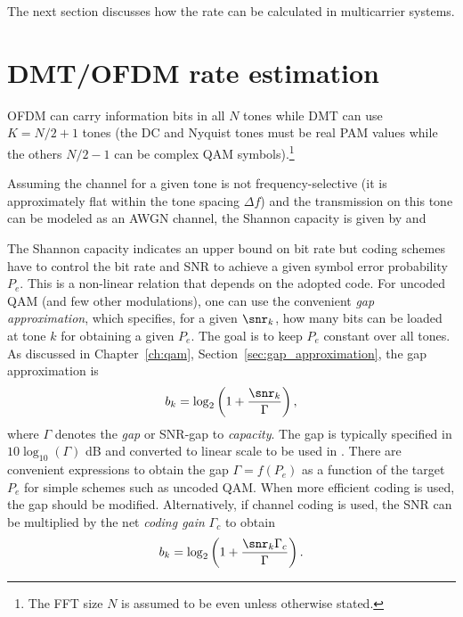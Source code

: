 
The next section discusses how the rate can be calculated in multicarrier systems.

\section {DMT/OFDM rate estimation}

OFDM can carry information bits in all $N$ tones while DMT can use $K=N/2+1$ tones (the DC and Nyquist tones must be real PAM values while the others $N/2-1$ can be complex QAM symbols).\footnote{The FFT size $N$ is assumed to be even unless otherwise stated.}

Assuming the channel for a given tone is not frequency-selective (it is approximately flat within the tone spacing $\Delta f$) and the transmission on this tone can be modeled as an AWGN channel, the Shannon capacity is given by  and

The Shannon capacity indicates an upper bound on bit rate but coding schemes have to control the bit rate and SNR to achieve a given symbol error probability $P_e$. This is a non-linear relation that depends on the adopted code. For uncoded QAM (and few other modulations), one can use the convenient \emph{gap approximation}, which specifies, for a given $\snr_k$, how many bits can be loaded at tone $k$ for obtaining a given $P_e$. The goal is to keep $P_e$ constant over all  tones. As discussed in 
\ifdefined\akAmazonBook
Chapter~\ref{ch:qam},
\else
Section~\ref{sec:gap_approximation},
\fi
the gap approximation is
\begin{equation}
b_k  = \log_2 \left(1 + \frac{\snr_k}{\Gamma }\right),
\label{eq:bitloading2}
\end{equation}
where $\Gamma$ denotes the \emph{gap} or SNR-gap to \emph{capacity}. The gap is typically specified in $10\log_{10}(\Gamma)$ dB and converted to linear scale to be used in . There are convenient expressions to obtain the gap $\Gamma = f(P_e)$ as a function of the target $P_e$ for simple schemes such as uncoded QAM. When more efficient coding is used, the gap should be modified. Alternatively, if channel coding is used, the SNR can be multiplied by the net \emph{coding gain} $\Gamma_c$ to obtain
\begin{equation}
b_k  = \log_2 \left(1 + \frac{\snr_k \Gamma_c}{\Gamma }\right).
\label{eq:bitloading3}
\end{equation}

